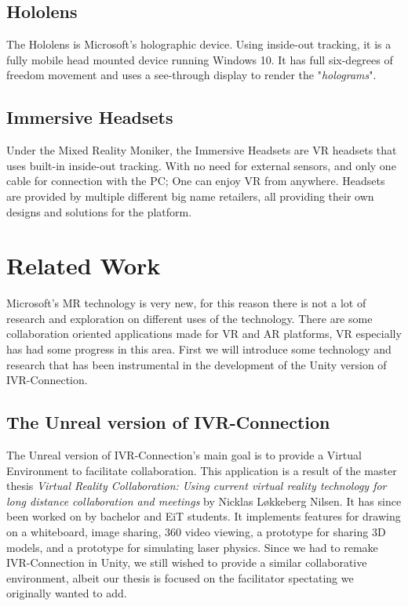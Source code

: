         \subsection{Hololens}
            The Hololens is Microsoft's holographic device. Using inside-out tracking, it is a fully mobile head mounted device running Windows 10. It has full six-degrees of freedom movement and uses a see-through display to render the "\emph{holograms}".
    
        \subsection{Immersive Headsets}
            Under the Mixed Reality Moniker, the Immersive Headsets are VR headsets that uses built-in inside-out tracking. With no need for external sensors, and only one cable for connection with the PC; One can enjoy VR from anywhere. Headsets are provided by multiple different big name retailers, all providing their own designs and solutions for the platform.
    
    \section{Related Work}
        Microsoft's MR technology is very new, for this reason there is not a lot of research and exploration on different uses of the technology. There are some collaboration oriented applications made for VR and AR platforms, VR especially has had some progress in this area. First we will introduce some technology and research that has been instrumental in the development of the Unity version of IVR-Connection.
        
        
        \subsection{The Unreal version of IVR-Connection}
            The Unreal version of IVR-Connection's main goal is to provide a Virtual Environment to facilitate collaboration. This application is a result of the master thesis \emph{Virtual Reality Collaboration: Using current virtual reality technology for long distance collaboration and meetings} by Nicklas Løkkeberg Nilsen. \cite{nilsen2017} It has since been worked on by bachelor and EiT students. It implements features for drawing on a whiteboard, image sharing, 360 video viewing, a prototype for sharing 3D models, and a prototype for simulating laser physics. Since we had to remake IVR-Connection in Unity, we still wished to provide a similar collaborative environment, albeit our thesis is focused on the facilitator spectating we originally wanted to add.
        
